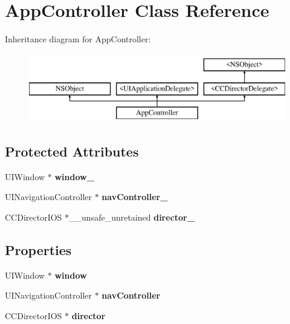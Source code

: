 \hypertarget{interface_app_controller}{\section{App\-Controller Class Reference}
\label{interface_app_controller}
}
Inheritance diagram for App\-Controller\-:\begin{figure}[H]
\begin{center}
\leavevmode
\includegraphics[height=3.000000cm]{interface_app_controller}
\end{center}
\end{figure}
\subsection*{Protected Attributes}
\begin{DoxyCompactItemize}
\item 
\hypertarget{interface_app_controller_aaa11603e8105cf07d028bde11f6ace04}{U\-I\-Window $\ast$ {\bfseries window\-\_\-}}\label{interface_app_controller_aaa11603e8105cf07d028bde11f6ace04}

\item 
\hypertarget{interface_app_controller_a17b79ebde0d994b3f56afe99a386e636}{U\-I\-Navigation\-Controller $\ast$ {\bfseries nav\-Controller\-\_\-}}\label{interface_app_controller_a17b79ebde0d994b3f56afe99a386e636}

\item 
\hypertarget{interface_app_controller_ab32e682fbcbcfc87112cda2b43ed48ff}{C\-C\-Director\-I\-O\-S $\ast$\-\_\-\-\_\-unsafe\-\_\-unretained {\bfseries director\-\_\-}}\label{interface_app_controller_ab32e682fbcbcfc87112cda2b43ed48ff}

\end{DoxyCompactItemize}
\subsection*{Properties}
\begin{DoxyCompactItemize}
\item 
\hypertarget{interface_app_controller_a42e8bda521a1849fddc70fff2fbe45d2}{U\-I\-Window $\ast$ {\bfseries window}}\label{interface_app_controller_a42e8bda521a1849fddc70fff2fbe45d2}

\item 
\hypertarget{interface_app_controller_a8bc0ccf2051f33459727e6194643d3cc}{U\-I\-Navigation\-Controller $\ast$ {\bfseries nav\-Controller}}\label{interface_app_controller_a8bc0ccf2051f33459727e6194643d3cc}

\item 
\hypertarget{interface_app_controller_abf5e165178fe588cf66d4d43d08dc007}{C\-C\-Director\-I\-O\-S $\ast$ {\bfseries director}}\label{interface_app_controller_abf5e165178fe588cf66d4d43d08dc007}

\end{DoxyCompactItemize}
